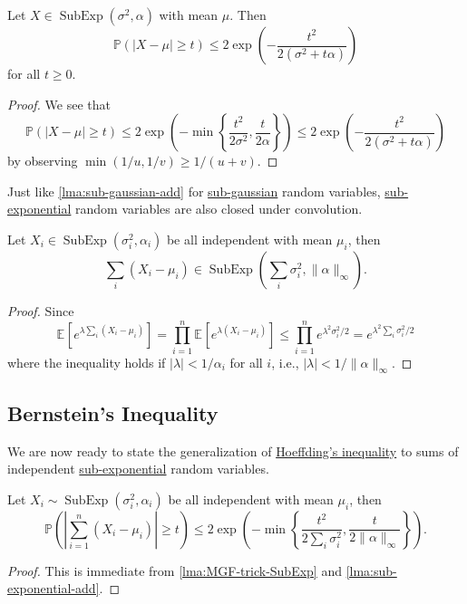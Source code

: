 \begin{corollary}\label{col:MGF-trick-SubExp}
	Let \(X \in \mathop{\mathrm{SubExp}}(\sigma ^{2} , \alpha ) \) with mean \(\mu \). Then
	\[
		\mathbb{P} (\vert X - \mu  \vert \geq t) \leq 2 \exp \left( - \frac{t^2}{2(\sigma ^{2} + t \alpha )} \right)
	\]
	for all \(t \geq 0\).
\end{corollary}
\begin{proof}
	We see that
	\[
		\mathbb{P} (\vert X - \mu  \vert \geq t)
		\leq 2 \exp \left( - \min \left\{ \frac{t^2}{2 \sigma ^{2} }, \frac{t}{2\alpha } \right\}  \right)
		\leq 2 \exp \left( - \frac{t^2}{2(\sigma ^{2} + t \alpha )} \right)
	\]
	by observing \(\min (1 / u, 1 / v ) \geq 1 / (u + v)\).
\end{proof}

Just like \autoref{lma:sub-gaussian-add} for \hyperref[def:sub-gaussian]{sub-gaussian} random variables, \hyperref[def:sub-exponential]{sub-exponential} random variables are also closed under convolution.

\begin{lemma}\label{lma:sub-exponential-add}
	Let \(X_i \in \mathop{\mathrm{SubExp}}(\sigma _i^{2} , \alpha _i) \) be all independent with mean \(\mu _i\), then
	\[
		\sum_{i} (X_i - \mu _i) \in \mathop{\mathrm{SubExp}}\left( \sum_{i} \sigma _i^2, \lVert \alpha  \rVert_\infty \right).
	\]
\end{lemma}
\begin{proof}
	Since
	\[
		\mathbb{E}_{}\left[e^{\lambda \sum_{i} (X_i - \mu _i)} \right]
		= \prod_{i=1}^{n} \mathbb{E}_{}\left[e^{\lambda (X_i - \mu _i)} \right]
		\leq \prod_{i=1}^n e^{\lambda ^2 \sigma _i^2 / 2}
		= e^{\lambda ^{2} \sum_{i} \sigma _i ^2 / 2}
	\]
	where the inequality holds if \(\vert \lambda \vert < 1 / \alpha _i\) for all \(i\), i.e., \(\vert \lambda \vert < 1 / \lVert \alpha \rVert_\infty \).
\end{proof}

\subsection{Bernstein's Inequality}
We are now ready to state the generalization of \hyperref[thm:Hoeffding-inequality]{Hoeffding's inequality} to sums of independent \hyperref[def:sub-exponential]{sub-exponential} random variables.

\begin{theorem}\label{thm:Bernstein-inequality}
	Let \(X_i \sim \mathop{\mathrm{SubExp}}(\sigma _i^{2} , \alpha _i) \) be all independent with mean \(\mu _i\), then
	\[
		\mathbb{P} \left( \left\vert \sum_{i=1}^{n} (X_i - \mu _i) \right\vert \geq t \right) \leq 2 \exp \left( - \min \left\{ \frac{t^{2} }{2 \sum_{i} \sigma _i^2}, \frac{t}{2 \lVert \alpha \rVert_\infty } \right\} \right) .
	\]
\end{theorem}
\begin{proof}
	This is immediate from \autoref{lma:MGF-trick-SubExp} and \autoref{lma:sub-exponential-add}.
\end{proof}

